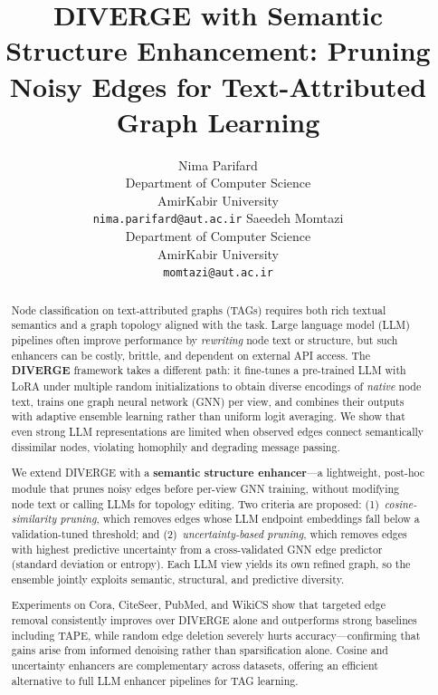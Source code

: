 \documentclass{article}
\title{DIVERGE with Semantic Structure Enhancement: Pruning Noisy Edges for Text-Attributed Graph Learning}
\author{
  Nima Parifard \\
  Department of Computer Science \\
  AmirKabir University \\
  \texttt{nima.parifard@aut.ac.ir}
  \And
  Saeedeh Momtazi \\
  Department of Computer Science \\
  AmirKabir University \\
  \texttt{momtazi@aut.ac.ir}
}
\begin{document}
\maketitle

\begin{abstract}
Node classification on text-attributed graphs (TAGs) requires both rich textual
semantics and a graph topology aligned with the task. Large language model (LLM)
pipelines often improve performance by \emph{rewriting} node text or structure, but
such enhancers can be costly, brittle, and dependent on external API access. The
\textbf{DIVERGE} framework takes a different path: it fine-tunes a pre-trained LLM with
LoRA under multiple random initializations to obtain diverse encodings of \emph{native}
node text, trains one graph neural network (GNN) per view, and combines their outputs
with adaptive ensemble learning rather than uniform logit averaging. We show that even
strong LLM representations are limited when observed edges connect semantically
dissimilar nodes, violating homophily and degrading message passing.

We extend DIVERGE with a \textbf{semantic structure enhancer}---a lightweight,
post-hoc module that prunes noisy edges before per-view GNN training, without modifying
node text or calling LLMs for topology editing. Two criteria are proposed:
(1)~\emph{cosine-similarity pruning}, which removes edges whose LLM endpoint embeddings
fall below a validation-tuned threshold; and
(2)~\emph{uncertainty-based pruning}, which removes edges with highest predictive
uncertainty from a cross-validated GNN edge predictor (standard deviation or entropy).
Each LLM view yields its own refined graph, so the ensemble jointly exploits semantic,
structural, and predictive diversity.

Experiments on Cora, CiteSeer, PubMed, and WikiCS show that targeted edge removal
consistently improves over DIVERGE alone and outperforms strong baselines including
TAPE, while random edge deletion severely hurts accuracy---confirming that gains arise
from informed denoising rather than sparsification alone. Cosine and uncertainty
enhancers are complementary across datasets, offering an efficient alternative to
full LLM enhancer pipelines for TAG learning.
\end{abstract}


\end{document}
